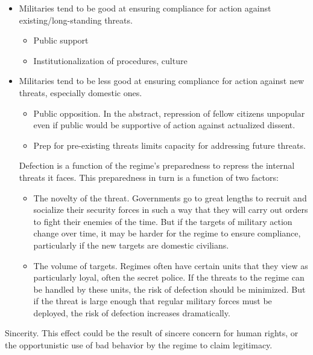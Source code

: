 \documentclass[
  12pt,
]{article}
\providecommand{\tightlist}{%
  \setlength{\itemsep}{0pt}\setlength{\parskip}{0pt}}
\begin{document}
\begin{itemize}
\item
  Militaries tend to be good at ensuring compliance for action against existing/long-standing threats.

  \begin{itemize}
  \tightlist
  \item
    Public support
  \item
    Institutionalization of procedures, culture
  \end{itemize}
\item
  Militaries tend to be less good at ensuring compliance for action against new threats, especially domestic ones.

  \begin{itemize}
  \tightlist
  \item
    Public opposition. In the abstract, repression of fellow citizens unpopular even if public would be supportive of action against actualized dissent.
  \item
    Prep for pre-existing threats limits capacity for addressing future threats.
  \end{itemize}

  Defection is a function of the regime's preparedness to repress the internal threats it faces. This preparedness in turn is a function of two factors:

  \begin{itemize}
  \tightlist
  \item
    The novelty of the threat. Governments go to great lengths to recruit and socialize their security forces in such a way that they will carry out orders to fight their enemies of the time. But if the targets of military action change over time, it may be harder for the regime to ensure compliance, particularly if the new targets are domestic civilians.
  \item
    The volume of targets. Regimes often have certain units that they view as particularly loyal, often the secret police. If the threats to the regime can be handled by these units, the risk of defection should be minimized. But if the threat is large enough that regular military forces must be deployed, the risk of defection increases dramatically.
  \end{itemize}
\end{itemize}

Sincerity. This effect could be the result of sincere concern for human rights, or the opportunistic use of bad behavior by the regime to claim legitimacy.
\end{document}
